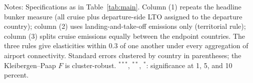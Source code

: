 \begin{table}[htbp]
\begin{threeparttable}
\begin{tabular}{lccc}
\bottomrule
\end{tabular}
\begin{tablenotes}[flushleft]
\footnotesize
\item Notes: Specifications as in Table~\ref{tab:main}. Column (1) repeats the headline bunker measure (all cruise plus departure-side LTO assigned to the departure country); column (2) uses landing-and-take-off emissions only (territorial rule); column (3) splits cruise emissions equally between the endpoint countries. The three rules give elasticities within 0.3 of one another under every aggregation of airport connectivity. Standard errors clustered by country in parentheses; the Kleibergen--Paap $F$ is cluster-robust. $^{***}$, $^{**}$, $^{*}$: significance at 1, 5, and 10 percent.
\end{tablenotes}
\end{threeparttable}
\end{table}
